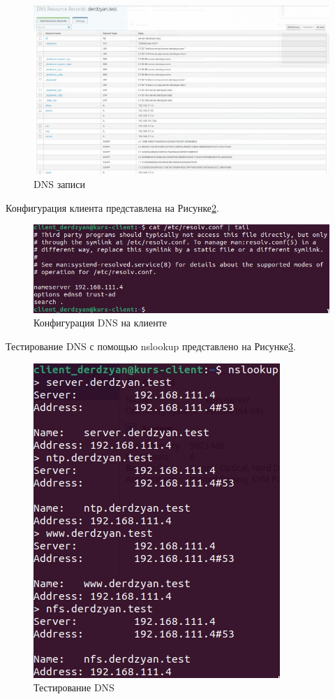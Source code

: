\begin{figure}[H]
\centering
\includegraphics[scale=0.3]{../misc/DNS_records.jpg}
\caption{DNS записи\label{fig:DNS_records}}
\end{figure}

Конфигурация клиента представлена на Рисунке\;\ref{fig:DNS_client_conf}.

\begin{figure}[H]
\centering
\includegraphics[scale=0.45]{../misc/DNS_client_conf.jpg}
\caption{Конфигурация DNS на клиенте\label{fig:DNS_client_conf}}
\end{figure}

Тестирование DNS с помощью nslookup представлено на Рисунке\;\ref{fig:DNS_client_test}.

\begin{figure}[H]
\centering
\includegraphics[scale=0.6]{../misc/DNS_client_test.jpg}
\caption{Тестирование DNS\label{fig:DNS_client_test}}
\end{figure}



